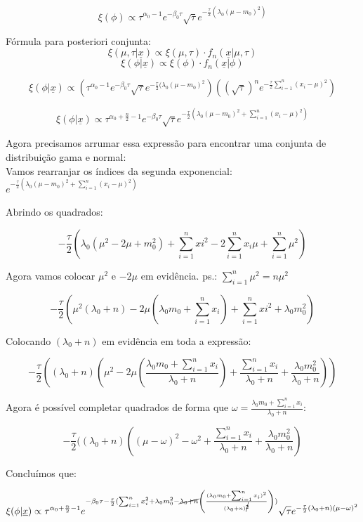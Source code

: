 \documentclass{article}
\begin{document}
	$$\xi(\phi) \propto \tau^{\alpha_0 - 1} e^{-\beta_0 \tau} \sqrt{ \tau} e^{-\frac{\tau}{2}(\lambda_0 (\mu - m_0)^2)}$$
	
	Fórmula para posteriori conjunta:
	$$\xi(\mu, \tau | \underline{x}) \propto \xi(\mu , \tau) \cdot f_n(\underline{x} | \mu, \tau)$$
	$$\xi(\phi | \underline{x}) \propto \xi(\phi) \cdot f_n(\underline{x} | \phi)$$
	
	$$\xi(\phi | \underline{x}) \propto \left(\tau^{\alpha_0 - 1} e^{-\beta_0 \tau} \sqrt{\tau} e^{-\frac{\tau}{2}(\lambda_0 (\mu - m_0)^2} \right) \left(\left(\sqrt{\tau}\right)^n e^{-\frac{\tau}{2} \sum_{i=1}^{n} (x_{i} - \mu)^2} \right)$$
	
	$$\xi(\phi | \underline{x}) \propto \tau^{\alpha_0 + \frac{n}{2} - 1} e^{-\beta_0 \tau} \sqrt{ \tau} e^{-\frac{\tau}{2}(\lambda_0 (\mu - m_0)^2 + \sum_{i=1}^{n}(x_i - \mu)^2)}$$

	Agora precisamos arrumar essa expressão para encontrar uma conjunta de distribuição gama e normal:\\

	
	Vamos rearranjar os índices da segunda exponencial: $e^{-\frac{\tau}{2}(\lambda_0 (\mu - m_0)^2 + \sum_{i=1}^{n}(x_i - \mu)^2)}$
	
	Abrindo os quadrados:
	
	$$-\frac{\tau}{2}(\lambda_0 (\mu^2 - 2\mu + m_0^2) + \sum_{i=1}^{n} xi^2 - 2\sum_{i=1}^{n}x_i \mu + \sum_{i=1}^{n} \mu^2)$$
	
	Agora vamos colocar $\mu^2$ e $- 2\mu$ em evidência. ps.: $\sum_{i=1}^{n}\mu^2 = n \mu^2$ 
	
	$$-\frac{\tau}{2} (\mu^2 (\lambda_0 + n) - 2\mu (\lambda_0 m_0 + \sum_{i=1}^{n}x_i) + \sum_{i=1}^{n}xi^2 + \lambda_0 m_0^2)$$
	
	Colocando $(\lambda_0 + n)$ em evidência em toda a expressão:
	
	$$-\frac{\tau}{2} ((\lambda_0 + n)(\mu^2 - 2 \mu \left(\frac{\lambda_0 m_0 + \sum_{i=1}^{n}x_i}{\lambda_0 + n}\right) + \frac{\sum_{i=1}^{n}x_i}{\lambda_0 + n} + \frac{\lambda_0 m_0^2}{\lambda_0 + n}))$$
	
	Agora é possível completar quadrados de forma que $\omega = \frac{\lambda_0 m_0 + \sum_{i=1}^{n}x_i}{\lambda_0 + n}$:
	
	$$-\frac{\tau}{2} ((\lambda_0 + n)((\mu - \omega)^2 - \omega^2 + \frac{\sum_{i=1}^{n}x_i}{\lambda_0 + n} + \frac{\lambda_0 m_0^2}{\lambda_0 + n})$$
	
	Concluímos que:
	
	$$\xi(\phi | \underline{x}) \propto \tau^{\alpha_0 + \frac{n}{2} - 1} e^{-\beta_0 \tau - \frac{\tau}{2} (\sum_{i=1}^{n}x_i^2 + \lambda_0 m_0^2 - \cancel{\lambda_0 + n} \left(\frac{(\lambda_0 m_0 + \sum_{i=1}^{n}x_i)^2}{(\lambda_0 + n)^{\cancel{2}}}\right))} \sqrt{\tau} e^{-\frac{\tau}{2}(\lambda_0 + n)(\mu - \omega)^2}$$
	
\end{document}
